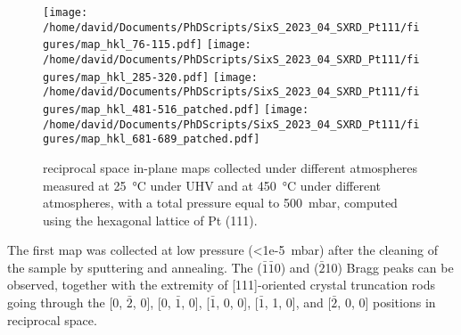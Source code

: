 

\begin{figure}[!htb]
    \centering
    \texttt{[image: /home/david/Documents/PhDScripts/SixS\_2023\_04\_SXRD\_Pt111/figures/map\_hkl\_76-115.pdf]}
    \texttt{[image: /home/david/Documents/PhDScripts/SixS\_2023\_04\_SXRD\_Pt111/figures/map\_hkl\_285-320.pdf]}
    \texttt{[image: /home/david/Documents/PhDScripts/SixS\_2023\_04\_SXRD\_Pt111/figures/map\_hkl\_481-516\_patched.pdf]}
    \texttt{[image: /home/david/Documents/PhDScripts/SixS\_2023\_04\_SXRD\_Pt111/figures/map\_hkl\_681-689\_patched.pdf]}
    \caption{
        reciprocal space in-plane maps collected under different atmospheres measured at \qty{25}{\degreeCelsius} under UHV and at \qty{450}{\degreeCelsius} under different atmospheres, with a total pressure equal to \qty{500}{\milli\bar}, computed using the hexagonal lattice of Pt (111).
    }
    \label{fig:MapsPt111A}
\end{figure}

The first map was collected at low pressure (\qty{<1e-5}{\milli\bar}) after the cleaning of the sample by sputtering and annealing.
The ($\bar{1}$$\bar{1}$0) and ($\bar{2}$10) Bragg peaks can be observed, together with the extremity of [111]-oriented crystal truncation rods going through the [0, $\bar{2}$, 0], [0, $\bar{1}$, 0], [$\bar{1}$, 0, 0], [$\bar{1}$, 1, 0], and [$\bar{2}$, 0, 0] positions in reciprocal space.

